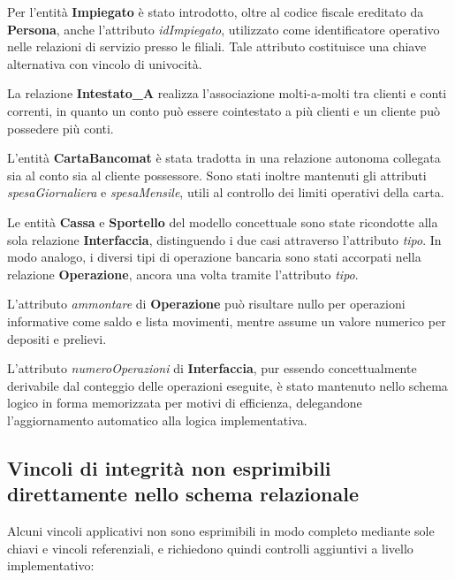 Per l'entità \textbf{Impiegato} è stato introdotto, oltre al codice fiscale ereditato da \textbf{Persona}, anche l'attributo \textit{idImpiegato}, utilizzato come identificatore operativo nelle relazioni di servizio presso le filiali. Tale attributo costituisce una chiave alternativa con vincolo di univocità.

La relazione \textbf{Intestato\_A} realizza l'associazione molti-a-molti tra clienti e conti correnti, in quanto un conto può essere cointestato a più clienti e un cliente può possedere più conti.

L'entità \textbf{CartaBancomat} è stata tradotta in una relazione autonoma collegata sia al conto sia al cliente possessore. Sono stati inoltre mantenuti gli attributi \textit{spesaGiornaliera} e \textit{spesaMensile}, utili al controllo dei limiti operativi della carta.

Le entità \textbf{Cassa} e \textbf{Sportello} del modello concettuale sono state ricondotte alla sola relazione \textbf{Interfaccia}, distinguendo i due casi attraverso l'attributo \textit{tipo}. In modo analogo, i diversi tipi di operazione bancaria sono stati accorpati nella relazione \textbf{Operazione}, ancora una volta tramite l'attributo \textit{tipo}.

L'attributo \textit{ammontare} di \textbf{Operazione} può risultare nullo per operazioni informative come saldo e lista movimenti, mentre assume un valore numerico per depositi e prelievi.

L'attributo \textit{numeroOperazioni} di \textbf{Interfaccia}, pur essendo concettualmente derivabile dal conteggio delle operazioni eseguite, è stato mantenuto nello schema logico in forma memorizzata per motivi di efficienza, delegandone l'aggiornamento automatico alla logica implementativa.

\subsection{Vincoli di integrità non esprimibili direttamente nello schema relazionale}

Alcuni vincoli applicativi non sono esprimibili in modo completo mediante sole chiavi e vincoli referenziali, e richiedono quindi controlli aggiuntivi a livello implementativo:

